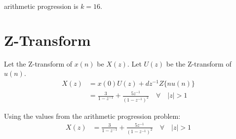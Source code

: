 \documentclass[12pt]{article}
\newcommand{\initialterm}{3}
\newcommand{\commondifference}{5}
\begin{document}
arithmetic progression is \(k = 16\).

\section{Z-Transform}
Let the Z-transform of \(x(n)\) be \(X(z)\). Let \(U(z)\) be the Z-transform of \(u(n)\).
\begin{align}
X(z) &= x(0)U(z) + dz^{-1}Z\{nu(n)\} \\
&= \frac{\initialterm}{1 - z^{-1}} + \frac{\commondifference z^{-1}}{(1 - z^{-1})^2} \quad \forall \quad |z| > 1
\end{align}

Using the values from the arithmetic progression problem:
\begin{align}
X(z) &= \frac{3}{1 - z^{-1}} + \frac{5z^{-1}}{(1 - z^{-1})^2} \quad \forall \quad |z| > 1
\end{align}
\end{document}
